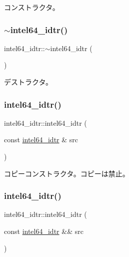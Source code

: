 コンストラクタ。 \hypertarget{classintel64__idtr_a586005a32f77ee5aa08830937cbae95f}{}\label{classintel64__idtr_a586005a32f77ee5aa08830937cbae95f} 
\subsubsection{\texorpdfstring{$\sim$intel64\+\_\+idtr()}{~intel64\_idtr()}}
{\footnotesize\ttfamily intel64\+\_\+idtr\+::$\sim$intel64\+\_\+idtr (\begin{DoxyParamCaption}{ }\end{DoxyParamCaption})\hspace{0.3cm}{\ttfamily [virtual]}}

デストラクタ。 \hypertarget{classintel64__idtr_a535cc4ec18b49a55074ffe2d0710f8dc}{}\label{classintel64__idtr_a535cc4ec18b49a55074ffe2d0710f8dc} 
\subsubsection{\texorpdfstring{intel64\+\_\+idtr()}{intel64\_idtr()}\hspace{0.1cm}{\footnotesize\ttfamily [2/3]}}
{\footnotesize\ttfamily intel64\+\_\+idtr\+::intel64\+\_\+idtr (\begin{DoxyParamCaption}\item[{const \hyperlink{classintel64__idtr}{intel64\+\_\+idtr} \&}]{src }\end{DoxyParamCaption})\hspace{0.3cm}{\ttfamily [delete]}}

コピーコンストラクタ。コピーは禁止。 \hypertarget{classintel64__idtr_adab09df4fd85370a17c1d6076a4d4b0e}{}\label{classintel64__idtr_adab09df4fd85370a17c1d6076a4d4b0e} 
\subsubsection{\texorpdfstring{intel64\+\_\+idtr()}{intel64\_idtr()}\hspace{0.1cm}{\footnotesize\ttfamily [3/3]}}
{\footnotesize\ttfamily intel64\+\_\+idtr\+::intel64\+\_\+idtr (\begin{DoxyParamCaption}\item[{const \hyperlink{classintel64__idtr}{intel64\+\_\+idtr} \&\&}]{src }\end{DoxyParamCaption})\hspace{0.3cm}{\ttfamily [delete]}}

